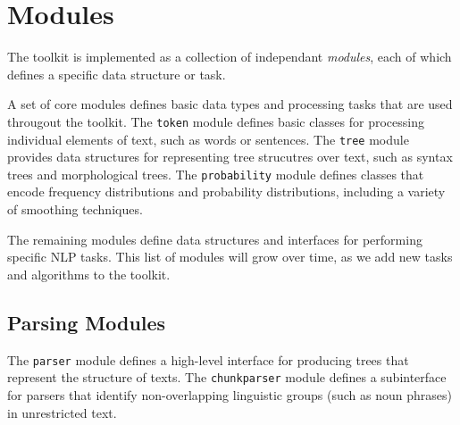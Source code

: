 \documentclass[11pt]{article}
\begin{document}

\section{Modules}

The toolkit is implemented as a collection of independant
\emph{modules}, each of which defines a specific data structure or
task.  

A set of core modules defines basic data types and processing tasks
that are used througout the toolkit.  The \texttt{token} module
defines basic classes for processing individual elements of text, such
as words or sentences.  The \texttt{tree} module provides data
structures for representing tree strucutres over text, such as syntax
trees and morphological trees.  The \texttt{probability} module
defines classes that encode frequency distributions and probability
distributions, including a variety of smoothing techniques.

The remaining modules define data structures and interfaces for
performing specific NLP tasks.  This list of modules will grow over
time, as we add new tasks and algorithms to the toolkit.

\subsection*{Parsing Modules}

The \texttt{parser} module defines a high-level interface for
producing trees that represent the structure of texts.  The
\texttt{chunkparser} module defines a subinterface for parsers that
identify non-overlapping linguistic groups (such as noun phrases) in
unrestricted text.  
\end{document}
